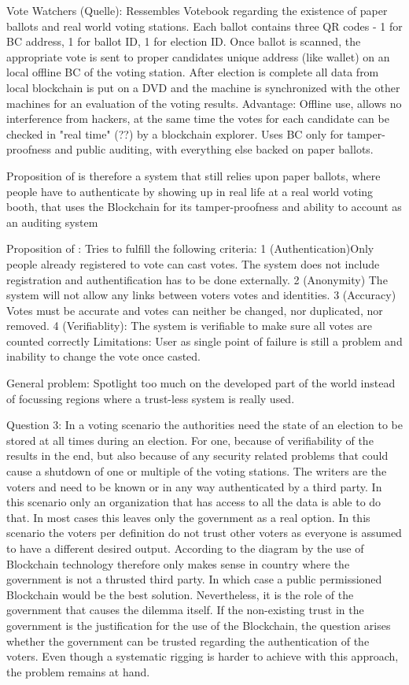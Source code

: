 Vote Watchers (Quelle): Ressembles Votebook regarding the existence of paper ballots and real world voting stations. Each ballot contains three QR codes - 1 for BC address, 1 for ballot ID, 1 for election ID. Once ballot is scanned, the appropriate vote is sent to proper candidates unique address (like wallet) on an local offline BC of the voting station. After election is complete all data from local blockchain is put on a DVD and the machine is synchronized with the other machines for an evaluation of the voting results. 
Advantage: Offline use, allows no interference from hackers, at the same time the votes for each candidate can be checked in "real time" (??) by a blockchain explorer.
Uses BC only for tamper-proofness and public auditing, with everything else backed on paper ballots.

Proposition of \citeauthor{Osgood2016} is therefore a system that still relies upon paper ballots, where people have to authenticate by showing up in real life at a real world voting booth, that uses the Blockchain for its tamper-proofness and ability to account as an auditing system

Proposition of \citeauthor{BenAyed2017}:
Tries to fulfill the following criteria: 1 (Authentication)Only people already registered to vote can cast votes. The system does not include registration and authentification has to be done externally. 2 (Anonymity) The system will not allow any links between voters votes and identities. 3 (Accuracy) Votes must be accurate and votes can neither be changed, nor duplicated, nor removed. 4 (Verifiablity): The system is verifiable to make sure all votes are counted correctly
Limitations: User as single point of failure is still a problem and inability to change the vote once casted.

General problem: Spotlight too much on the developed part of the world instead of focussing regions where a trust-less system is really used.

Question 3: 
In a voting scenario the authorities need the state of an election to be stored at all times during an election. For one, because of verifiability of the results in the end, but also because of any security related problems that could cause a shutdown of one or multiple of the voting stations. The writers are the voters and need to be known or in any way authenticated by a third party. In this scenario only an organization that has access to all the data is able to do that. In most cases this leaves only the government as a real option. In this scenario the voters per definition do not trust other voters as everyone is assumed to have a different desired output. 
According to the diagram by  \citeauthor{Wust2017} the use of Blockchain technology therefore only makes sense in country where the government is not a thrusted third party. In which case a public permissioned Blockchain would be the best solution.
Nevertheless, it is the role of the government that causes the dilemma itself. If the non-existing trust in the government is the justification for the use of the Blockchain, the question arises whether the government can be trusted regarding the authentication of the voters. Even though a systematic rigging is harder to achieve with this approach, the problem remains at hand. 

